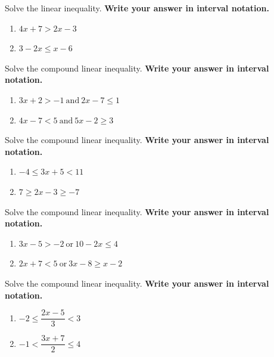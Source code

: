 \begin{exercise}

Solve the linear inequality. \textbf{Write your answer in interval
notation.}

\begin{enumerate}
\item
  \(4x + 7 > 2x-3\)
\item
  \(3-2x \le x-6\)
\end{enumerate}

\end{exercise}

\begin{exercise}

Solve the compound linear inequality. \textbf{Write your answer in
interval notation.}

\begin{enumerate}
\item
  \(3x+2>-1 ~\text{and}~ 2x-7\leq 1\)
\item
  \(4x -7< 5 ~\text{and}~ 5x-2\geq 3\)
\end{enumerate}

\end{exercise}

\begin{exercise}

Solve the compound linear inequality. \textbf{Write your answer in
interval notation.}

\begin{enumerate}
\item
  \(-4\leq 3x+5<11\)
\item
  \(7\geq 2x-3\geq -7\)
\end{enumerate}

\end{exercise}

\begin{exercise}

Solve the compound linear inequality. \textbf{Write your answer in
interval notation.}

\begin{enumerate}
\item
  \(3x-5>-2 ~\text{or}~ 10-2x\leq 4\)
\item
  \(2x + 7<5 ~\text{or}~ 3x-8\geq x-2\)
\end{enumerate}

\end{exercise}

\begin{exercise}

Solve the compound linear inequality. \textbf{Write your answer in
interval notation.}

\begin{enumerate}
\item
  \(-2\leq \dfrac{2x-5}{3}<3\)
\item
  \(-1< \dfrac{3x+7}{2}\leq 4\)
\end{enumerate}

\end{exercise}

